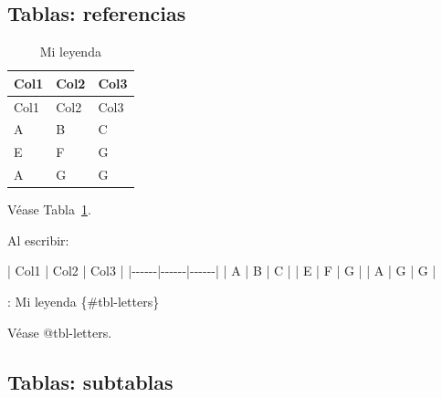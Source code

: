 \documentclass[
  letterpaper,
  DIV=11,
  numbers=noendperiod]{scrartcl}
\newenvironment{Shaded}{\begin{snugshade}}{\end{snugshade}}
\newcommand{\NormalTok}[1]{\textcolor[rgb]{0.00,0.23,0.31}{#1}}
\begin{document}
\subsection{Tablas: referencias}\label{tablas-referencias}

\begin{longtable}[]{@{}lll@{}}
\caption{Mi leyenda}\label{tbl-letters}\tabularnewline
\toprule\noalign{}
Col1 & Col2 & Col3 \\
\midrule\noalign{}
\endfirsthead
\toprule\noalign{}
Col1 & Col2 & Col3 \\
\midrule\noalign{}
\endhead
\bottomrule\noalign{}
\endlastfoot
A & B & C \\
E & F & G \\
A & G & G \\
\end{longtable}

Véase Tabla~\ref{tbl-letters}.

Al escribir:

\begin{Shaded}
\begin{Highlighting}[]
\NormalTok{| Col1 | Col2 | Col3 |}
\NormalTok{|{-}{-}{-}{-}{-}{-}|{-}{-}{-}{-}{-}{-}|{-}{-}{-}{-}{-}{-}|}
\NormalTok{| A    | B    | C    |}
\NormalTok{| E    | F    | G    |}
\NormalTok{| A    | G    | G    |}

\NormalTok{: Mi leyenda \{\#tbl{-}letters\}}

\NormalTok{Véase @tbl{-}letters.}
\end{Highlighting}
\end{Shaded}

\subsection{Tablas: subtablas}\label{tablas-subtablas}
\end{document}
